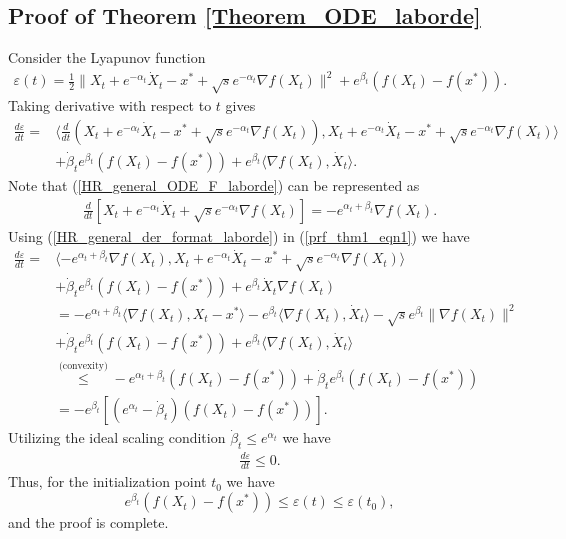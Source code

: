 \documentclass{article}
\theoremstyle{plain}
\theoremstyle{definition}
\theoremstyle{remark}
\begin{document}
\subsection{Proof of Theorem \ref{Theorem_ODE_laborde}}\label{thm1_proof}
Consider the Lyapunov function 
\begin{align}\label{lyap_theorem_C}
    \varepsilon(t)=\frac{1}{2}\|X_t+e^{-\alpha_t}\dot X_t-x^*+\sqrt{s}e^{-\alpha_t}\nabla f(X_t)\|^2+e^{\beta_t}(f(X_t)-f(x^*)).
\end{align}
Taking derivative with respect to $t$ gives
\begin{align}\label{prf_thm1_eqn1}
    \frac{d \varepsilon}{dt}=&\langle \frac{d}{dt}(X_t+e^{-\alpha_t}\dot X_t-x^*+\sqrt{s}e^{-\alpha_t}\nabla f(X_t)),X_t+e^{-\alpha_t}\dot X_t-x^*+\sqrt{s}e^{-\alpha_t}\nabla f(X_t)\rangle\nonumber\\
    & +\dot \beta_t e^{\beta_t}(f(X_t)-f(x^*))+e^{\beta_t}\langle \nabla f(X_t), \dot X_t\rangle.
\end{align}
Note that (\ref{HR_general_ODE_F_laborde}) can be represented as
\begin{align}\label{HR_general_der_format_laborde}
    \frac{d}{dt}\left[X_t+e^{-\alpha_t}\dot X_t+\sqrt{s}e^{-\alpha_t}\nabla f(X_t)\right]=-e^{\alpha_t+\beta_t}\nabla f(X_t).
\end{align}
Using (\ref{HR_general_der_format_laborde}) in (\ref{prf_thm1_eqn1}) we have
\begin{align}
     \frac{d \varepsilon}{dt}=& \langle -e^{\alpha_t+\beta_t}\nabla f(X_t),X_t+e^{-\alpha_t}\dot X_t-x^*+\sqrt{s}e^{-\alpha_t}\nabla f(X_t) \rangle \nonumber \\
     &+\dot \beta_t e^{\beta_t}(f(X_t)-f(x^*))+e^{\beta_t}\dot X_t\nabla f(X_t)\nonumber\\
     &= -e^{\alpha_t+\beta_t}\langle\nabla f(X_t),X_t-x^*\rangle -e^{\beta_t}\langle \nabla f(X_t),\dot X_t\rangle -\sqrt{s}e^{\beta_t}\|\nabla f(X_t)\|^2\nonumber\\
     &+\dot \beta_te^{\beta_t}(f(X_t)-f(x^*))+e^{\beta_t}\langle \nabla f(X_t),\dot X_t \rangle\nonumber\\
     & \overset{\text{(convexity)}}{\leq} -e^{\alpha_t+\beta_t}(f(X_t)-f(x^*))+\dot \beta_te^{\beta_t}(f(X_t)-f(x^*))\nonumber\\
     & = -e^{\beta_t}\left[(e^{\alpha_t}-\dot \beta_t)(f(X_t)-f(x^*))\right].\nonumber
\end{align}
Utilizing the ideal scaling condition $\dot \beta_t\leq e^{\alpha_t}$ we have
\begin{align}
     \frac{d \varepsilon}{dt}\leq 0.\nonumber
\end{align}
Thus, for the initialization point $t_0$ we have
$$e^{\beta_t}(f(X_t)-f(x^*))\leq \varepsilon(t)\leq \varepsilon(t_0),$$
and the proof is complete.
\end{document}
